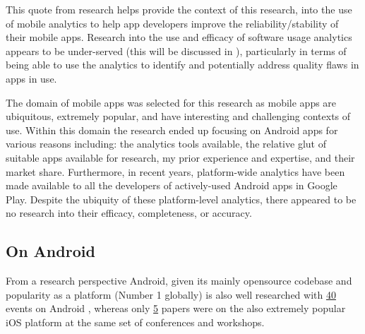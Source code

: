 This quote from research helps provide the context of this research, into the use of mobile analytics to help app developers improve the reliability/stability of their mobile apps.
%
Research into the use and efficacy of software usage analytics appears to be under-served (this will be discussed in ), particularly in terms of being able to use the analytics to identify and potentially address quality flaws in apps in use.

The domain of mobile apps was selected for this research as mobile apps are ubiquitous, extremely popular, and have interesting and challenging contexts of use. Within this domain the research ended up focusing on Android apps for various reasons including: the analytics tools available, the relative glut of suitable apps available for research, my prior experience and expertise, and their market share. Furthermore, in recent years, platform-wide analytics have been made available to all the developers of actively-used Android apps in Google Play. Despite the ubiquity of these platform-level analytics, there appeared to be no research into their efficacy, completeness, or accuracy.

\subsection{On Android}
From a research perspective Android, given its mainly opensource codebase and popularity as a platform (Number 1 globally) is also well researched with 
\href{https://conf.researchr.org/search/icse-2022/android/events}{40} events on Android %
, whereas only \href{https://conf.researchr.org/search/icse-2022/ios/events}{5} %
papers were on the also extremely popular iOS platform at the same set of conferences and workshops.

